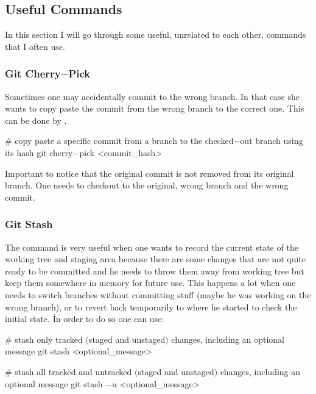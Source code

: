 \subsection{Useful Commands}

In this section I will go through some useful, unrelated to each other, commands that I often use.

\subsubsection{Git Cherry$-$Pick}

Sometimes one may accidentally commit to the wrong branch. In that case she wants to copy paste the commit from the
wrong branch to the correct one. This can be done by .

\begin{bash}
# copy paste a specific commit from a branch to the checked$-$out branch using its hash
git cherry$-$pick <commit_hash>
\end{bash}

Important to notice that the original commit is not removed from its original branch. One needs to checkout to the
original, wrong branch and  the wrong commit.

\subsubsection{Git Stash}
The  command is very useful when one wants to record the current state of the working tree and
staging area because there are some changes that are not quite ready to be committed and he needs to throw them away
from working tree but keep them somewhere in memory for future use. This happens a lot when one needs to switch
branches without committing stuff (maybe he was working on the wrong branch), or to revert back temporarily to where
he started to check the initial state. \v

In order to do so one can use:

\begin{bash}
# stash only tracked $($staged and unstaged$)$ changes, including an optional message
git stash <optional_message>
\end{bash}

\begin{bash}
# stash all tracked and untracked $($staged and unstaged$)$ changes, including an optional message
git stash $-$u <optional_message>
\end{bash}

